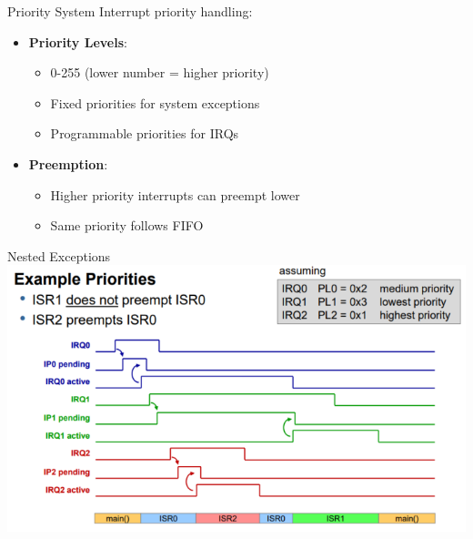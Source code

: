 \begin{concept}{Priority System}
Interrupt priority handling:
\begin{itemize}
  \item \textbf{Priority Levels}:
    \begin{itemize}
      \item 0-255 (lower number = higher priority)
      \item Fixed priorities for system exceptions
      \item Programmable priorities for IRQs
    \end{itemize}
  \item \textbf{Preemption}:
    \begin{itemize}
      \item Higher priority interrupts can preempt lower
      \item Same priority follows FIFO
    \end{itemize}
\end{itemize}
\end{concept}

\begin{definition}{Nested Exceptions}\\
\includegraphics[width=\linewidth]{images/nested_exceptions.png}  
\end{definition}


